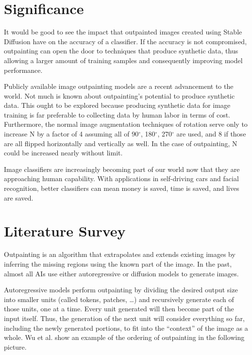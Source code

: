 \documentclass[conference]{IEEEtran}
\begin{document}
\section{Significance}

It would be good to see the impact that outpainted images created using Stable Diffusion have on the accuracy of a classifier. If the accuracy is not compromised, outpainting can open the door to techniques that produce synthetic data, thus allowing a larger amount of training samples and consequently improving model performance.

Publicly available image outpainting models are a recent advancement to the world. Not much is known about outpainting's potential to produce synthetic data. This ought to be explored because producing synthetic data for image training is far preferable to collecting data by human labor in terms of cost. Furthermore, the normal image augmentation techniques of rotation serve only to increase N by a factor of 4 assuming all of 90$^\circ$, 180$^\circ$, 270$^\circ$ are used, and 8 if those are all flipped horizontally and vertically as well. In the case of outpainting, N could be increased nearly without limit.

Image classifiers are increasingly becoming part of our world now that they are approaching human capability. With applications in self-driving cars and facial recognition, better classifiers can mean money is saved, time is saved, and lives are saved.

\section{Literature Survey}

Outpainting is an algorithm that extrapolates and extends existing images by inferring the missing regions using the known part of the image. In the past, almost all AIs use either autoregressive or diffusion models to generate images. 

Autoregressive models perform outpainting by dividing the desired output size into smaller units (called tokens, patches, …) and recursively generate each of those units, one at a time. Every unit generated will then become part of the input itself. Thus, the generation of the next unit will consider everything so far, including the newly generated portions, to fit into the “context” of the image as a whole. Wu et al. \cite{wu2022nuwainfinity} show an example of the ordering of outpainting in the following picture.
\end{document}

